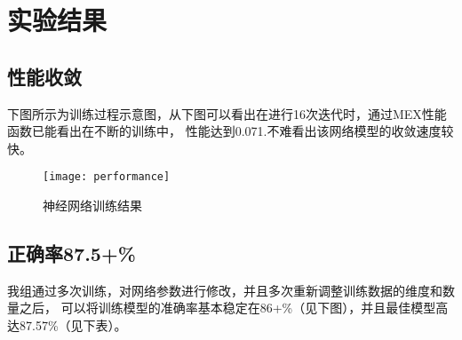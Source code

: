 \section{实验结果}

\subsection{性能收敛}

下图所示为训练过程示意图，从下图可以看出在进行16次迭代时，通过MEX性能函数已能看出在不断的训练中，
性能达到0.071.不难看出该网络模型的收敛速度较快。

\begin{figure}[ht]
	\centering
	\texttt{[image: performance]}
	\caption{神经网络训练结果}
	\label{fig:performance}
\end{figure}

\subsection{正确率87.5+\%}

\begin{figure}
	\begin{floatrow}
	\end{floatrow}
\end{figure}

我组通过多次训练，对网络参数进行修改，并且多次重新调整训练数据的维度和数量之后，
可以将训练模型的准确率基本稳定在86+\%（见下图），并且最佳模型高达87.57\%（见下表）。